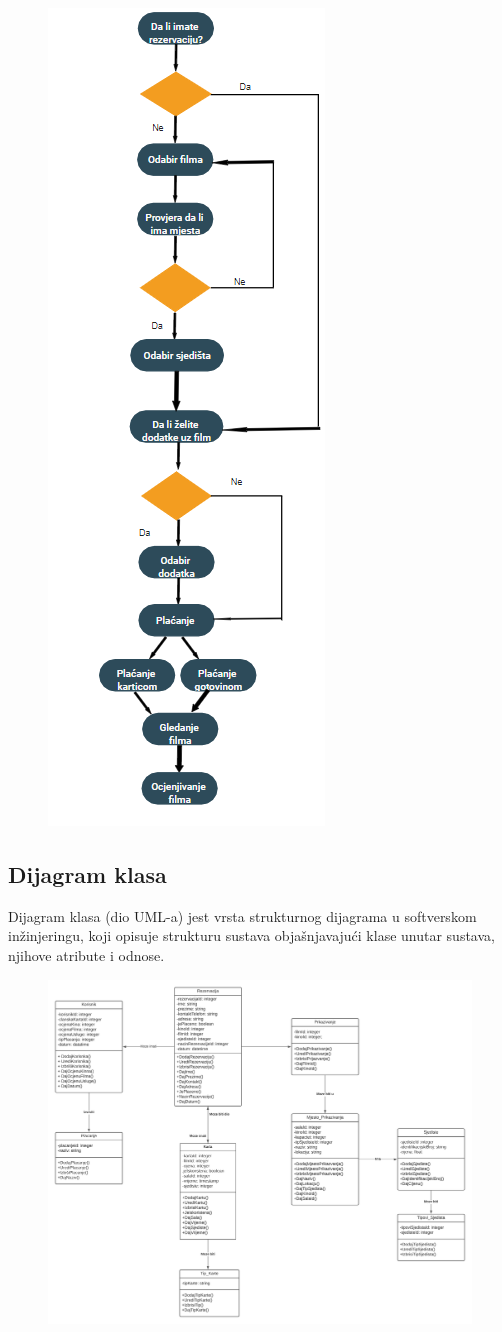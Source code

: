 \documentclass[12pt,table,xcdraw]{article}
\begin{document}
\begin{figure}[h]
\centering
\captionsetup{justification=centering}
\includegraphics[width=0.35\columnwidth]{slike/slika2.png}
\label{fig:kod}
\end{figure}


\newpage
\subsection{Dijagram klasa}

Dijagram klasa (dio UML-a) jest vrsta strukturnog dijagrama u softverskom inžinjeringu, koji opisuje strukturu sustava objašnjavajući klase unutar sustava, njihove atribute i odnose.

\begin{figure}[h]
\centering
\captionsetup{justification=centering}
\includegraphics[width=0.85\columnwidth]{slike/slika3.png}
\label{fig:kod}
\end{figure}
\end{document}
